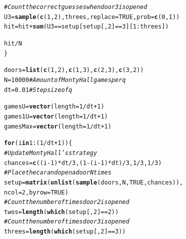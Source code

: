 \documentclass{article}\usepackage[]{graphicx}\usepackage[]{color}
\makeatletter
\newcommand{\hlnum}[1]{\textcolor[rgb]{0.686,0.059,0.569}{#1}}%
\newcommand{\hlcom}[1]{\textcolor[rgb]{0.678,0.584,0.686}{\textit{#1}}}%
\newcommand{\hlopt}[1]{\textcolor[rgb]{0,0,0}{#1}}%
\newcommand{\hlstd}[1]{\textcolor[rgb]{0.345,0.345,0.345}{#1}}%
\newcommand{\hlkwa}[1]{\textcolor[rgb]{0.161,0.373,0.58}{\textbf{#1}}}%
\newcommand{\hlkwb}[1]{\textcolor[rgb]{0.69,0.353,0.396}{#1}}%
\newcommand{\hlkwc}[1]{\textcolor[rgb]{0.333,0.667,0.333}{#1}}%
\newcommand{\hlkwd}[1]{\textcolor[rgb]{0.737,0.353,0.396}{\textbf{#1}}}%
\newenvironment{kframe}{%
 \def\at@end@of@kframe{}%
 \ifinner\ifhmode%
  \def\at@end@of@kframe{\end{minipage}}%
  \begin{minipage}{\columnwidth}%
 \fi\fi%
 \def\FrameCommand##1{\hskip\@totalleftmargin \hskip-\fboxsep
 \colorbox{shadecolor}{##1}\hskip-\fboxsep
     \hskip-\linewidth \hskip-\@totalleftmargin \hskip\columnwidth}%
 \MakeFramed {\advance\hsize-\width
   \@totalleftmargin\z@ \linewidth\hsize
   \@setminipage}}%
 {\par\unskip\endMakeFramed%
 \at@end@of@kframe}
\newenvironment{knitrout}{}{} %
\makeatother
\begin{document}
\begin{knitrout}
\begin{kframe}
\begin{alltt}
  \hlcom{# Count the correct guesses when door 3 is opened}
  \hlstd{U3} \hlkwb{=} \hlkwd{sample}\hlstd{(}\hlkwd{c}\hlstd{(}\hlnum{1}\hlstd{,}\hlnum{2}\hlstd{), threes,} \hlkwc{replace} \hlstd{=} \hlnum{TRUE}\hlstd{,} \hlkwc{prob} \hlstd{=} \hlkwd{c}\hlstd{(}\hlnum{0}\hlstd{,}\hlnum{1}\hlstd{))}
  \hlstd{hit} \hlkwb{=} \hlstd{hit} \hlopt{+} \hlkwd{sum}\hlstd{(U3} \hlopt{==} \hlstd{setup[setup[,}\hlnum{2}\hlstd{]} \hlopt{==} \hlnum{3}\hlstd{][}\hlnum{1}\hlopt{:}\hlstd{threes])}

  \hlstd{hit}\hlopt{/}\hlstd{N}
\hlstd{\}}

\hlstd{doors} \hlkwb{=} \hlkwd{list}\hlstd{(}\hlkwd{c}\hlstd{(}\hlnum{1}\hlstd{,}\hlnum{2}\hlstd{),} \hlkwd{c}\hlstd{(}\hlnum{1}\hlstd{,}\hlnum{3}\hlstd{),} \hlkwd{c}\hlstd{(}\hlnum{2}\hlstd{,}\hlnum{3}\hlstd{),} \hlkwd{c}\hlstd{(}\hlnum{3}\hlstd{,}\hlnum{2}\hlstd{))}
\hlstd{N} \hlkwb{=} \hlnum{10000} \hlcom{# Amount of Monty Hall games per q}
\hlstd{dt} \hlkwb{=} \hlnum{0.01} \hlcom{# Step size of q}

\hlstd{gamesU} \hlkwb{=} \hlkwd{vector}\hlstd{(}\hlkwc{length}\hlstd{=}\hlnum{1}\hlopt{/}\hlstd{dt}\hlopt{+}\hlnum{1}\hlstd{)}
\hlstd{games1U} \hlkwb{=} \hlkwd{vector}\hlstd{(}\hlkwc{length}\hlstd{=}\hlnum{1}\hlopt{/}\hlstd{dt}\hlopt{+}\hlnum{1}\hlstd{)}
\hlstd{gamesMax} \hlkwb{=} \hlkwd{vector}\hlstd{(}\hlkwc{length}\hlstd{=}\hlnum{1}\hlopt{/}\hlstd{dt}\hlopt{+}\hlnum{1}\hlstd{)}

\hlkwa{for} \hlstd{(i} \hlkwa{in} \hlnum{1}\hlopt{:}\hlstd{(}\hlnum{1}\hlopt{/}\hlstd{dt}\hlopt{+}\hlnum{1}\hlstd{)) \{}
  \hlcom{# Update Monty Hall's strategy}
  \hlstd{chances} \hlkwb{=} \hlkwd{c}\hlstd{((i}\hlopt{-}\hlnum{1}\hlstd{)}\hlopt{*}\hlstd{dt}\hlopt{/}\hlnum{3}\hlstd{, (}\hlnum{1}\hlopt{-}\hlstd{(i}\hlopt{-}\hlnum{1}\hlstd{)}\hlopt{*}\hlstd{dt)}\hlopt{/}\hlnum{3}\hlstd{,} \hlnum{1}\hlopt{/}\hlnum{3}\hlstd{,} \hlnum{1}\hlopt{/}\hlnum{3}\hlstd{)}
  \hlcom{# Place the car and open a door N times}
  \hlstd{setup} \hlkwb{=} \hlkwd{matrix}\hlstd{(}\hlkwd{unlist}\hlstd{(}\hlkwd{sample}\hlstd{(doors, N,} \hlnum{TRUE}\hlstd{, chances)),}
                 \hlkwc{ncol} \hlstd{=} \hlnum{2}\hlstd{,} \hlkwc{byrow} \hlstd{=} \hlnum{TRUE}\hlstd{)}
  \hlcom{# Count the number of times door 2 is opened}
  \hlstd{twos} \hlkwb{=} \hlkwd{length}\hlstd{(}\hlkwd{which}\hlstd{(setup[,}\hlnum{2}\hlstd{]} \hlopt{==} \hlnum{2}\hlstd{))}
  \hlcom{# Count the number of times door 3 is opened}
  \hlstd{threes} \hlkwb{=} \hlkwd{length}\hlstd{(}\hlkwd{which}\hlstd{(setup[,}\hlnum{2}\hlstd{]} \hlopt{==} \hlnum{3}\hlstd{))}


\end{alltt}
\end{kframe}
\end{knitrout}
\end{document}
